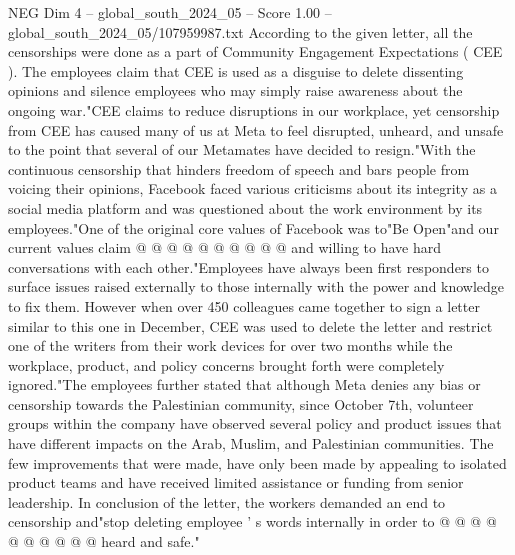 \begin{textsample}{NEG Dim 4 – global\_south\_2024\_05 – Score 1.00 – global\_south\_2024\_05/107959987.txt}
According to the given letter, all the censorships were done as a part of Community Engagement Expectations ( CEE ).
The employees claim that CEE is used as a disguise to delete dissenting opinions and silence employees who may simply raise awareness about the ongoing war."CEE claims to reduce disruptions in our workplace, yet censorship from CEE has caused many of us at Meta to feel disrupted, unheard, and unsafe to the point that several of our Metamates have decided to resign."With the continuous censorship that hinders freedom of speech and bars people from voicing their opinions, Facebook faced various criticisms about its integrity as a social media platform and was questioned about the work environment by its employees."One of the original core values of Facebook was to"Be Open"and our current values claim @ @ @ @ @ @ @ @ @ @ and willing to have hard conversations with each other."Employees have always been first responders to surface issues raised externally to those internally with the power and knowledge to fix them.
However when over 450 colleagues came together to sign a letter similar to this one in December, CEE was used to delete the letter and restrict one of the writers from their work devices for over two months while the workplace, product, and policy concerns brought forth were completely ignored."The employees further stated that although Meta denies any bias or censorship towards the Palestinian community, since October 7th, volunteer groups within the company have observed several policy and product issues that have different impacts on the Arab, Muslim, and Palestinian communities.
The few improvements that were made, have only been made by appealing to isolated product teams and have received limited assistance or funding from senior leadership.
In conclusion of the letter, the workers demanded an end to censorship and"stop deleting employee ' s words internally in order to @ @ @ @ @ @ @ @ @ @ heard and safe."

\end{textsample}
